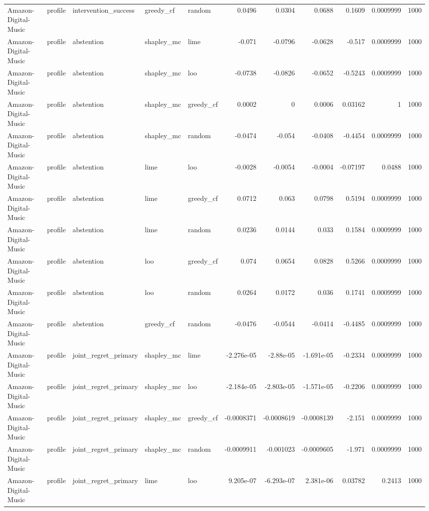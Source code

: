 \begin{table}[t]
\begin{tabular}{lllllrrrrrr}
Amazon-Digital-Music & profile & intervention\_success & greedy\_cf & random & 0.0496 & 0.0304 & 0.0688 & 0.1609 & 0.0009999 & 1000 \\
Amazon-Digital-Music & profile & abstention & shapley\_mc & lime & -0.071 & -0.0796 & -0.0628 & -0.517 & 0.0009999 & 1000 \\
Amazon-Digital-Music & profile & abstention & shapley\_mc & loo & -0.0738 & -0.0826 & -0.0652 & -0.5243 & 0.0009999 & 1000 \\
Amazon-Digital-Music & profile & abstention & shapley\_mc & greedy\_cf & 0.0002 & 0 & 0.0006 & 0.03162 & 1 & 1000 \\
Amazon-Digital-Music & profile & abstention & shapley\_mc & random & -0.0474 & -0.054 & -0.0408 & -0.4454 & 0.0009999 & 1000 \\
Amazon-Digital-Music & profile & abstention & lime & loo & -0.0028 & -0.0054 & -0.0004 & -0.07197 & 0.0488 & 1000 \\
Amazon-Digital-Music & profile & abstention & lime & greedy\_cf & 0.0712 & 0.063 & 0.0798 & 0.5194 & 0.0009999 & 1000 \\
Amazon-Digital-Music & profile & abstention & lime & random & 0.0236 & 0.0144 & 0.033 & 0.1584 & 0.0009999 & 1000 \\
Amazon-Digital-Music & profile & abstention & loo & greedy\_cf & 0.074 & 0.0654 & 0.0828 & 0.5266 & 0.0009999 & 1000 \\
Amazon-Digital-Music & profile & abstention & loo & random & 0.0264 & 0.0172 & 0.036 & 0.1741 & 0.0009999 & 1000 \\
Amazon-Digital-Music & profile & abstention & greedy\_cf & random & -0.0476 & -0.0544 & -0.0414 & -0.4485 & 0.0009999 & 1000 \\
Amazon-Digital-Music & profile & joint\_regret\_primary & shapley\_mc & lime & -2.276e-05 & -2.88e-05 & -1.691e-05 & -0.2334 & 0.0009999 & 1000 \\
Amazon-Digital-Music & profile & joint\_regret\_primary & shapley\_mc & loo & -2.184e-05 & -2.803e-05 & -1.571e-05 & -0.2206 & 0.0009999 & 1000 \\
Amazon-Digital-Music & profile & joint\_regret\_primary & shapley\_mc & greedy\_cf & -0.0008371 & -0.0008619 & -0.0008139 & -2.151 & 0.0009999 & 1000 \\
Amazon-Digital-Music & profile & joint\_regret\_primary & shapley\_mc & random & -0.0009911 & -0.001023 & -0.0009605 & -1.971 & 0.0009999 & 1000 \\
Amazon-Digital-Music & profile & joint\_regret\_primary & lime & loo & 9.205e-07 & -6.293e-07 & 2.381e-06 & 0.03782 & 0.2413 & 1000 \\

\end{tabular}
\end{table}
